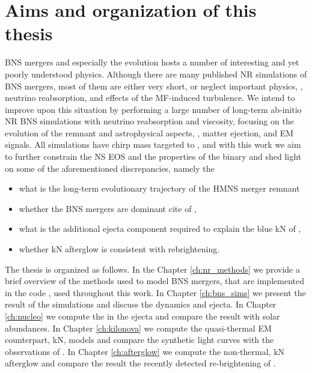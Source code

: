 
\section{Aims and organization of this thesis}

\ac{BNS} mergers and especially the \pmerg{} evolution hosts a number of interesting 
and yet poorly understood physics. Although there are many published \ac{NR} simulations of \ac{BNS} mergers, 
most of them are either very short, or neglect important physics, \eg, neutrino reabsorption, 
and effects of the \ac{MF}-induced turbulence. 
%
We intend to improve upon this situation by performing a large number of long-term ab-initio 
\ac{NR} \ac{BNS} simulations with neutrino reabsorption and viscosity, focusing on the 
\pmerg{} evolution of the remnant and astrophysical aspects, \ie, matter ejection, 
\rproc{} \nuc{} and \ac{EM} signals. 
%
All simulations have chirp mass targeted to \GW{}, and with this work we aim to further 
constrain the \ac{NS} \ac{EOS} and the properties of the binary and shed light on 
some of the aforementioned discrepancies, namely the 
\begin{itemize}
    \item what is the long-term evolutionary trajectory of the \ac{HMNS} merger remnant
    \item whether the \ac{BNS} mergers are dominant cite of \rproc{}, 
    \item what is the additional ejecta component required to explain the blue \ac{kN} of \AT{}, 
    \item whether \ac{kN} afterglow is consistent with \GRB{} rebrightening.
\end{itemize}

The thesis is organized as follows.
In the Chapter \ref{ch:nr_methods} we provide a brief overview of the methods used to model  \ac{BNS} mergers, 
that are implemented in the code \wisky{}, used throughout this work.
In Chapter \ref{ch:bns_sims} we present the result of the simulations and discuss the \pmerg{} dynamics and ejecta.
In Chapter \ref{ch:nucleo} we compute the \rproc{} \nuc{} in the ejecta and compare the result with 
solar abundances.
In Chapter \ref{ch:kilonova} we compute the quasi-thermal \ac{EM} counterpart, \ac{kN}, models and compare 
the synthetic light curves with the observations of \AT{}.
In Chapter \ref{ch:afterglow} we compute the non-thermal, \ac{kN} afterglow and compare the 
result the recently detected re-brightening of \GRB{}.